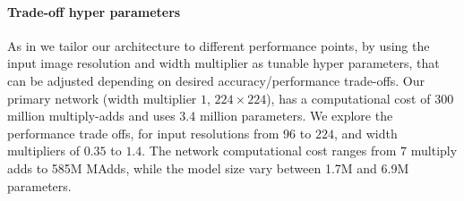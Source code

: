 \documentclass[10pt,twocolumn,letterpaper]{article}
\begin{document}
\begin{table}[t]
    \centering
\vspace{0pt}
\caption{
    The max number of channels/memory (in Kb) that needs to be materialized at each spatial resolution for different architectures.
    We assume 16-bit floats for activations.
    For \mbox{ShuffleNet}, we use $2x, g=3$ that matches the performance of \mbox{MobileNetV1} and \mbox{MobileNetV2}.
    For the first layer of  \mbox{MobileNetV2} and  \mbox{ShuffleNet} we can employ the trick described in Section~\ref{sec:implementation} to reduce memory requirement.
    Even though \mbox{ShuffleNet} employs bottlenecks elsewhere, the non-bottleneck tensors still need to be materialized due to the presence of shortcuts between the non-bottleneck tensors.
}
\label{tab:my_label}
\end{table}

\paragraph{Trade-off hyper parameters}
As in \cite{MobilenetV1} we tailor our architecture to different performance points, by using the input image resolution  and width multiplier as tunable hyper parameters, that can be adjusted depending on desired accuracy/performance trade-offs. Our primary network (width multiplier $1$, $224\times 224$), has a computational cost of 300 million multiply-adds and uses 3.4 million parameters. We explore the performance trade offs, for input resolutions from $96$ to $224$, and width multipliers of $0.35$ to $1.4$.
The network computational cost ranges from $7$ multiply adds to 585M MAdds, while the model size vary between 1.7M and 6.9M parameters.
\end{document}
